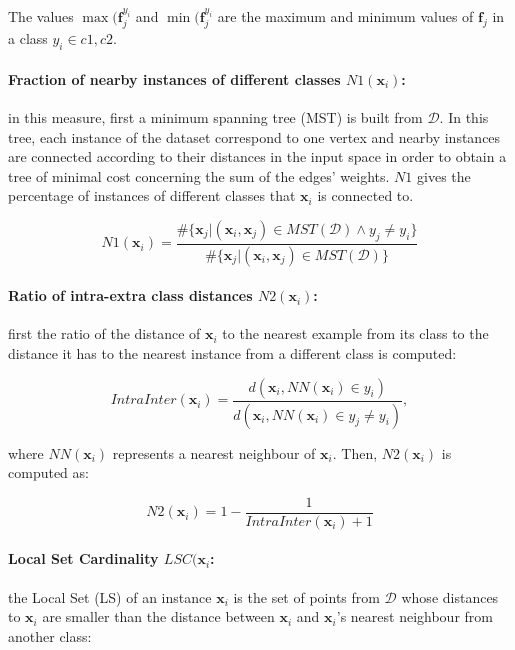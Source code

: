The values $\max(\mathbf{f}_j^{y_i}$ and $\min(\mathbf{f}_j^{y_i}$ are the maximum and minimum values of $\mathbf{f}_j$ in a class $y_i \in {c1 , c2 }$.

\paragraph*{Fraction of nearby instances of different classes $N1(\mathbf{x}_i)$:} in this measure, first a minimum spanning tree (MST) is built from $\mathcal{D}$. In this tree, each instance of the dataset correspond to one vertex and nearby instances are connected according to their distances in the input space in order to obtain a tree of minimal cost concerning the sum of the edges' weights. $N1$ gives the percentage of instances of different classes that $\mathbf{x}_i$ is connected to.

\begin{equation}
	N1(\mathbf{x}_i) = \frac{\# \{ \mathbf{x}_j | (\mathbf{x}_i, \mathbf{x}_j) \in MST(\mathcal{D}) \wedge y_j \neq y_i  \}}{\# \{ \mathbf{x}_j | (\mathbf{x}_i, \mathbf{x}_j) \in MST(\mathcal{D}) \}}
\end{equation}

\paragraph*{Ratio of intra-extra class distances $N2(\mathbf{x}_i)$:} first the ratio of the distance of $\mathbf{x}_i$ to the nearest example from its class to the distance it has to the nearest instance from a different class is computed:

\begin{equation}
	IntraInter(\mathbf{x}_i) = \frac{d(\mathbf{x}_i, NN(\mathbf{x}_i) \in y_i)}{d(\mathbf{x}_i, NN(\mathbf{x}_i) \in y_j \neq y_i)},
\end{equation}

where $NN(\mathbf{x}_i)$ represents a nearest neighbour of $\mathbf{x}_i$. Then, $N2(\mathbf{x}_i)$ is computed as:

\begin{equation}
	N2(\mathbf{x}_i) = 1 - \frac{1}{IntraInter(\mathbf{x}_i) + 1}
\end{equation}

\paragraph*{Local Set Cardinality $LSC(\mathbf{x}_i$:} the Local Set (LS) of an instance $\mathbf{x}_i$ is the set of points from $\mathcal{D}$ whose distances to $\mathbf{x}_i$ are smaller than the distance between $\mathbf{x}_i$ and $\mathbf{x}_i$'s nearest neighbour from another class:

